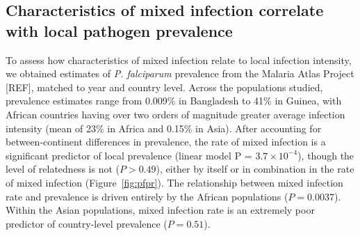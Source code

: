 \documentclass[9pt,lineno]{elife}
\begin{document}
\begin{figure}[ht]
\begin{center}
   \end{center}
\end{figure}



\subsection{Characteristics of mixed infection correlate with local pathogen prevalence}

To assess how characteristics of mixed infection relate to local infection intensity, we obtained estimates of {\it P. falciparum} prevalence from the Malaria Atlas Project [REF], matched to year and country level.  Across the populations studied, prevalence estimates range from 0.009\% in Bangladesh to 41\% in Guinea, with African countries having over two orders of magnitude greater average infection intensity (mean of 23\% in Africa and 0.15\% in Asia).  After accounting for between-continent differences in prevalence, the rate of mixed infection is a significant predictor of local prevalence (linear model P = $3.7 \times 10^{-4}$), though the level of relatedness is not ($P>0.49$), either by itself or in combination in the rate of mixed infection (Figure~\ref{fig:pfpr}).  The relationship between mixed infection rate and prevalence is  driven entirely by the African populations ($P = 0.0037$).  Within the Asian populations, mixed infection rate is an extremely poor predictor of country-level prevalence ($P = 0.51$). 
\end{document}
